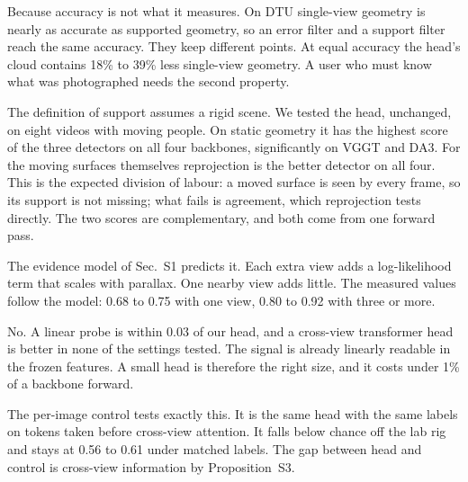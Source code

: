 Because accuracy is not what it measures. On DTU single-view geometry is nearly as accurate as supported geometry, so an error filter and a support filter reach the same accuracy. They keep different points. At equal accuracy the head's cloud contains 18\% to 39\% less single-view geometry. A user who must know what was photographed needs the second property.

The definition of support assumes a rigid scene. We tested the head, unchanged, on eight videos with moving people. On static geometry it has the highest score of the three detectors on all four backbones, significantly on VGGT and DA3. For the moving surfaces themselves reprojection is the better detector on all four. This is the expected division of labour: a moved surface is seen by every frame, so its support is not missing; what fails is agreement, which reprojection tests directly. The two scores are complementary, and both come from one forward pass.

The evidence model of Sec.~S1 predicts it. Each extra view adds a log-likelihood term that scales with parallax. One nearby view adds little. The measured values follow the model: 0.68 to 0.75 with one view, 0.80 to 0.92 with three or more.

No. A linear probe is within 0.03 of our head, and a cross-view transformer head is better in none of the settings tested. The signal is already linearly readable in the frozen features. A small head is therefore the right size, and it costs under 1\% of a backbone forward.

The per-image control tests exactly this. It is the same head with the same labels on tokens taken before cross-view attention. It falls below chance off the lab rig and stays at 0.56 to 0.61 under matched labels. The gap between head and control is cross-view information by Proposition~S3.
